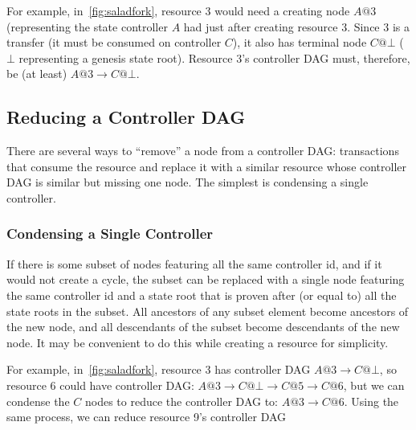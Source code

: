 \documentclass[a4paper,USenglish,cleveref, autoref, thm-restate, anonymous]{lipics-v2021}
\begin{document}
For example, in~\cref{fig:saladfork}, resource 3 would need a creating node $A@3$ (representing the state controller $A$ had just after creating resource $3$.
Since $3$ is a transfer (it must be consumed on controller $C$), it also has terminal node $C@\bot$ ($\bot$ representing a genesis state root). 
Resource 3's controller DAG must, therefore, be (at least) $A@3 \rightarrow C@\bot$.

\subsection{Reducing a Controller DAG}
There are several ways to ``remove'' a node from a controller DAG: transactions that consume the resource and replace it with a similar resource whose controller DAG is similar but missing one node. 
The simplest is condensing a single controller.

\subsubsection{Condensing a Single Controller}
If there is some subset of nodes featuring all the same controller id, and if it would not create a cycle, the subset can be replaced with a single node featuring the same controller id and a state root that is proven after (or equal to) all the state roots in the subset. 
All ancestors of any subset element become ancestors of the new node, and all descendants of the subset become descendants of the new node. 
It may be convenient to do this while creating a resource for simplicity.

For example, in~\cref{fig:saladfork}, resource 3 has controller DAG $A@3 \rightarrow C@\bot$, so resource 6 could have controller DAG: $A@3 \rightarrow C@\bot\rightarrow C@5\rightarrow C@6$, but we can condense the $C$ nodes to reduce the controller DAG to: $A@3 \rightarrow C@6$.
Using the same process, we can reduce resource 9's controller DAG
\end{document}
